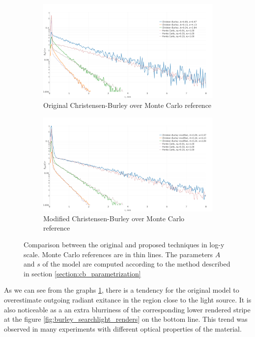 \begin{figure}[h]
    \centering
    \begin{subfigure}{\textwidth}
        \includegraphics[width=\textwidth]{imgs/plots/cb_original_fitting}
        \caption{Original Christensen-Burley over Monte Carlo reference}
    \end{subfigure}
    \begin{subfigure}{\textwidth}
        \includegraphics[width=\textwidth]{imgs/plots/cb_modified_fitting}
        \caption{Modified Christensen-Burley over Monte Carlo reference}
    \end{subfigure}

    \caption{Comparison between the original and proposed techniques in log-y
    scale. Monte Carlo references are in thin lines. The parameters $A$ and $s$ of the model are
    computed according to the method described in section \ref{section:cb_parametrization}}
    \label{fig:burley_fitting}
\end{figure}

As we can see from the graphs \ref{fig:burley_fitting}, there is a tendency for
the original model to overestimate outgoing radiant exitance in the region close
to the light source. It is also noticeable as a an extra blurriness of the corresponding
lower rendered stripe at the figure \ref{fig:burley_searchlight_renders} on the bottom line. This
trend was observed in many experiments with different optical properties of the material.


